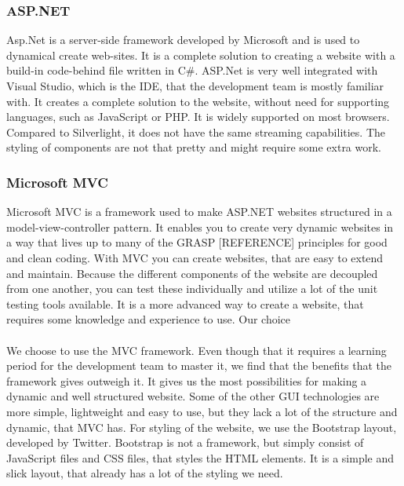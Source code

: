 \documentclass[a4paper,11pt,report]{article}
\begin{document}
\subsubsection{ASP.NET}
Asp.Net is a server-side framework developed by Microsoft and is used to dynamical create web-sites. It is a complete solution to creating a website with a build-in code-behind file written in C\#. ASP.Net is very well integrated with Visual Studio, which is the IDE, that the development team is mostly familiar with. It creates a complete solution to the website, without need for supporting languages, such as JavaScript or PHP. It is widely supported on most browsers. Compared to Silverlight, it does not have the same streaming capabilities. The styling of components are not that pretty and might require some extra work.

\subsubsection{Microsoft MVC}

Microsoft MVC is a framework used to make ASP.NET websites structured in a model-view-controller pattern. It enables you to create very dynamic websites in a way that lives up to many of the GRASP [REFERENCE] principles for good and clean coding. With MVC you can create websites, that are easy to extend and maintain. Because the different components of the website are decoupled from one another, you can test these individually and utilize a lot of the unit testing tools available. It is a more advanced way to create a website, that requires some knowledge and experience to use.
Our choice
\\ \\
We choose to use the MVC framework. Even though that it requires a learning period for the development team to master it, we find that the benefits that the framework gives outweigh it.  It gives us the most possibilities for making a dynamic and well structured website. Some of the other GUI technologies are more simple, lightweight and easy to use, but they lack a lot of the structure and dynamic, that MVC has. For styling of the website, we use the Bootstrap layout, developed by Twitter. Bootstrap is not a framework, but simply consist of JavaScript files and CSS files, that styles the HTML elements. It is a simple and slick layout, that already has a lot of the styling we need.
\end{document}
